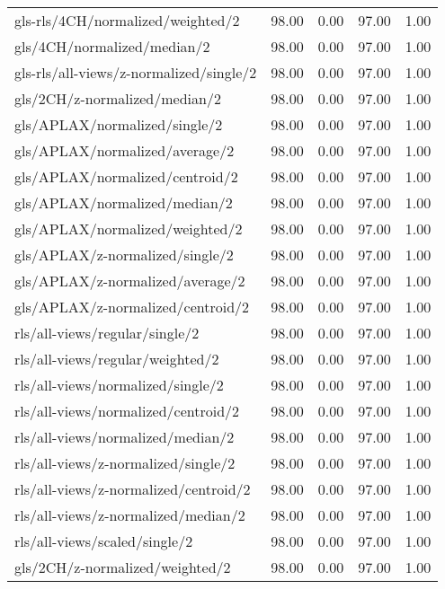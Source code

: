 \begin{longtable}{lrrrr}
    gls-rls/4CH/normalized/weighted/2         & 98.00 &  0.00 & 97.00 &  1.00 \\
    gls/4CH/normalized/median/2               & 98.00 &  0.00 & 97.00 &  1.00 \\
    gls-rls/all-views/z-normalized/single/2   & 98.00 &  0.00 & 97.00 &  1.00 \\
    gls/2CH/z-normalized/median/2             & 98.00 &  0.00 & 97.00 &  1.00 \\
    gls/APLAX/normalized/single/2             & 98.00 &  0.00 & 97.00 &  1.00 \\
    gls/APLAX/normalized/average/2            & 98.00 &  0.00 & 97.00 &  1.00 \\
    gls/APLAX/normalized/centroid/2           & 98.00 &  0.00 & 97.00 &  1.00 \\
    gls/APLAX/normalized/median/2             & 98.00 &  0.00 & 97.00 &  1.00 \\
    gls/APLAX/normalized/weighted/2           & 98.00 &  0.00 & 97.00 &  1.00 \\
    gls/APLAX/z-normalized/single/2           & 98.00 &  0.00 & 97.00 &  1.00 \\
    gls/APLAX/z-normalized/average/2          & 98.00 &  0.00 & 97.00 &  1.00 \\
    gls/APLAX/z-normalized/centroid/2         & 98.00 &  0.00 & 97.00 &  1.00 \\
    rls/all-views/regular/single/2            & 98.00 &  0.00 & 97.00 &  1.00 \\
    rls/all-views/regular/weighted/2          & 98.00 &  0.00 & 97.00 &  1.00 \\
    rls/all-views/normalized/single/2         & 98.00 &  0.00 & 97.00 &  1.00 \\
    rls/all-views/normalized/centroid/2       & 98.00 &  0.00 & 97.00 &  1.00 \\
    rls/all-views/normalized/median/2         & 98.00 &  0.00 & 97.00 &  1.00 \\
    rls/all-views/z-normalized/single/2       & 98.00 &  0.00 & 97.00 &  1.00 \\
    rls/all-views/z-normalized/centroid/2     & 98.00 &  0.00 & 97.00 &  1.00 \\
    rls/all-views/z-normalized/median/2       & 98.00 &  0.00 & 97.00 &  1.00 \\
    rls/all-views/scaled/single/2             & 98.00 &  0.00 & 97.00 &  1.00 \\
    gls/2CH/z-normalized/weighted/2           & 98.00 &  0.00 & 97.00 &  1.00 \\

\end{longtable}
